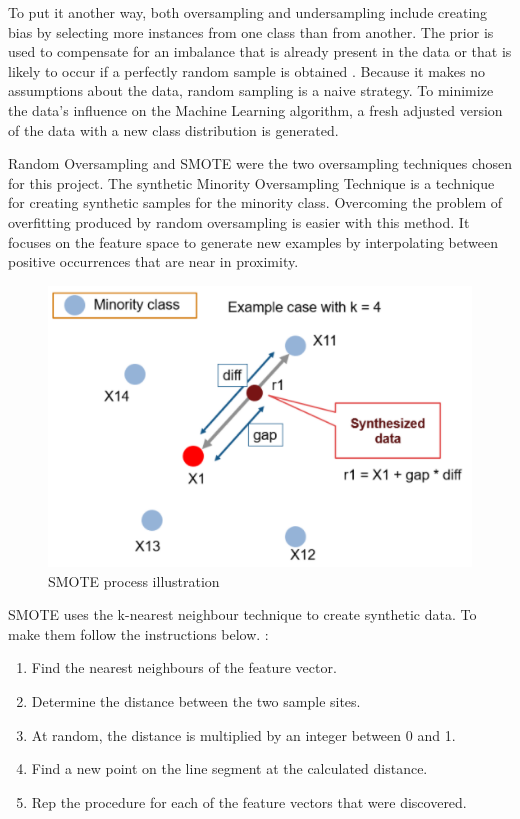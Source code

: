To put it another way, both oversampling and undersampling include creating bias by selecting more instances from one class than from another. The prior is used to compensate for an imbalance that is already present in the data or that is likely to occur if a perfectly random sample is obtained \cite{smote2}. Because it makes no assumptions about the data, random sampling is a naive strategy. To minimize the data's influence on the Machine Learning algorithm, a fresh adjusted version of the data with a new class distribution is generated.

Random Oversampling and SMOTE were the two oversampling techniques chosen for this project. The synthetic Minority Oversampling Technique is a technique for creating synthetic samples for the minority class. Overcoming the problem of overfitting produced by random oversampling is easier with this method. It focuses on the feature space to generate new examples by interpolating between positive occurrences that are near in proximity.

\begin{figure}[H]
\centering
\includegraphics[scale=0.7]{img/SMOTE.PNG}
\caption{SMOTE process illustration}
\label{fig:smoteproc}
\end{figure}

SMOTE uses the k-nearest neighbour technique to create synthetic data. To make them follow the instructions below. \cite{smote1}:

\begin{enumerate}
    \item Find the nearest neighbours of the feature vector.
    \item Determine the distance between the two sample sites.
    \item At random, the distance is multiplied by an integer between 0 and 1.
    \item Find a new point on the line segment at the calculated distance.
    \item Rep the procedure for each of the feature vectors that were discovered.
\end{enumerate}


